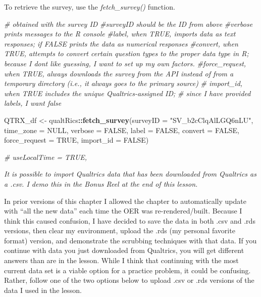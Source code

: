 \documentclass[
  11pt,
]{book}
\newenvironment{Shaded}{\begin{snugshade}}{\end{snugshade}}
\newcommand{\AttributeTok}[1]{\textcolor[rgb]{0.27,0.27,0.27}{#1}}
\newcommand{\CommentTok}[1]{\textcolor[rgb]{0.37,0.37,0.37}{\textit{#1}}}
\newcommand{\ConstantTok}[1]{\textcolor[rgb]{0.37,0.37,0.37}{#1}}
\newcommand{\FunctionTok}[1]{\textcolor[rgb]{0.27,0.27,0.27}{\textbf{#1}}}
\newcommand{\NormalTok}[1]{#1}
\newcommand{\OtherTok}[1]{\textcolor[rgb]{0.37,0.37,0.37}{#1}}
\newcommand{\SpecialCharTok}[1]{\textcolor[rgb]{0.43,0.43,0.43}{\textbf{#1}}}
\newcommand{\StringTok}[1]{\textcolor[rgb]{0.5,0.5,0.5}{#1}}
\begin{document}
To retrieve the survey, use the \emph{fetch\_survey()} function.

\begin{Shaded}
\begin{Highlighting}[]
\CommentTok{\# obtained with the survey ID}
\CommentTok{\#\textquotesingle{}surveyID\textquotesingle{} should be the ID from above}
\CommentTok{\#\textquotesingle{}verbose\textquotesingle{} prints messages to the R console}
\CommentTok{\#\textquotesingle{}label\textquotesingle{}, when TRUE, imports data as text responses; if FALSE prints the data as numerical responses}
\CommentTok{\#\textquotesingle{}convert\textquotesingle{}, when TRUE, attempts to convert certain question types to the \textquotesingle{}proper\textquotesingle{} data type in R; because I don\textquotesingle{}t like guessing, I want to set up my own factors.}
\CommentTok{\#\textquotesingle{}force\_request\textquotesingle{}, when TRUE, always downloads the survey from the API instead of from a temporary directory (i.e., it always goes to the primary source)}
\CommentTok{\# \textquotesingle{}import\_id\textquotesingle{}, when TRUE includes the unique Qualtrics{-}assigned ID;}
\CommentTok{\# since I have provided labels, I want false}

\NormalTok{QTRX\_df }\OtherTok{\textless{}{-}}\NormalTok{ qualtRics}\SpecialCharTok{::}\FunctionTok{fetch\_survey}\NormalTok{(}\AttributeTok{surveyID =} \StringTok{"SV\_b2cClqAlLGQ6nLU"}\NormalTok{, }\AttributeTok{time\_zone =} \ConstantTok{NULL}\NormalTok{,}
    \AttributeTok{verbose =} \ConstantTok{FALSE}\NormalTok{, }\AttributeTok{label =} \ConstantTok{FALSE}\NormalTok{, }\AttributeTok{convert =} \ConstantTok{FALSE}\NormalTok{, }\AttributeTok{force\_request =} \ConstantTok{TRUE}\NormalTok{,}
    \AttributeTok{import\_id =} \ConstantTok{FALSE}\NormalTok{)}

\CommentTok{\# useLocalTime = TRUE,}
\end{Highlighting}
\end{Shaded}

\emph{It is possible to import Qualtrics data that has been downloaded from Qualtrics as a .csv. I demo this in the Bonus Reel at the end of this lesson.}

In prior versions of this chapter I allowed the chapter to automatically update with ``all the new data'' each time the OER was re-rendered/built. Because I think this caused confusion, I have decided to save the data in both .csv and .rds versions, then clear my environment, upload the .rds (my personal favorite format) version, and demonstrate the scrubbing techniques with that data. If you continue with data you just downloaded from Qualtrics, you will get different answers than are in the lesson. While I think that continuing with the most current data set is a viable option for a practice problem, it could be confusing. Rather, follow one of the two options below to upload .csv or .rds versions of the data I used in the lesson.
\end{document}
